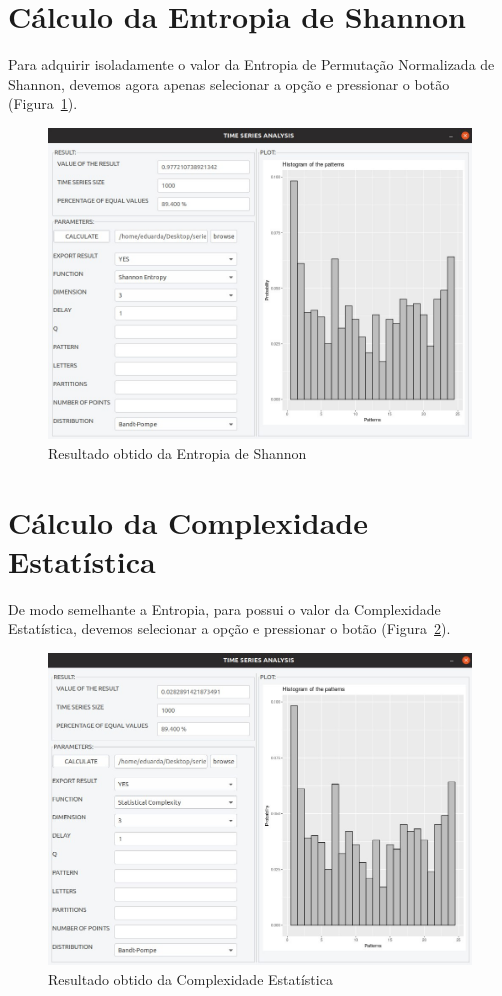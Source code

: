 \section{Cálculo da Entropia de Shannon}

Para adquirir isoladamente o valor da Entropia de Permutação Normalizada de Shannon, devemos agora apenas selecionar a opção  e pressionar o botão  (Figura~\ref{fig:shannon}).

\begin{figure}[!hbt]
	\centering
	\includegraphics[width=0.85\columnwidth]{capitulos/imagens/Shannon} 
    \caption{Resultado obtido da Entropia de Shannon}
    \label{fig:shannon}
\end{figure}

\section{Cálculo da Complexidade Estatística}

De modo semelhante a Entropia, para possui o valor da Complexidade Estatística, devemos selecionar a opção  e pressionar o botão  (Figura~\ref{fig:complexity}).

\begin{figure}[!hbt]
	\centering
	\includegraphics[width=0.85\columnwidth]{capitulos/imagens/complexity} 
    \caption{Resultado obtido da Complexidade Estatística}
    \label{fig:complexity}
\end{figure}

